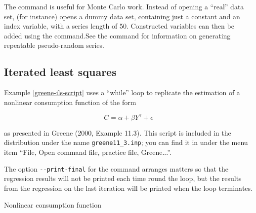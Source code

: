 The command  is useful for Monte Carlo work.  Instead of
opening a ``real'' data set,  (for instance) opens a
dummy data set, containing just a constant and an index variable, with
a series length of 50. Constructed variables can then be added using
the  command.See the  command for information on
generating repeatable pseudo-random series.

\subsection{Iterated least squares}
\label{loop-ils-examples}

Example \ref{greene-ils-script} uses a ``while'' loop to replicate the
estimation of a nonlinear consumption function of the form
	
\[ C = \alpha + \beta Y^{\gamma} + \epsilon \]

as presented in Greene (2000, Example 11.3).  This script is included
in the  distribution under the name \verb+greene11_3.inp+;
you can find it in  under the menu item ``File, Open
command file, practice file, Greene...''.

The option \verb+--print-final+ for the  command arranges
matters so that the regression results will not be printed each time
round the loop, but the results from the regression on the last
iteration will be printed when the loop terminates.

\begin{script}[htbp]
  \caption{Nonlinear consumption function}
  \label{greene-ils-script}
\end{script}

